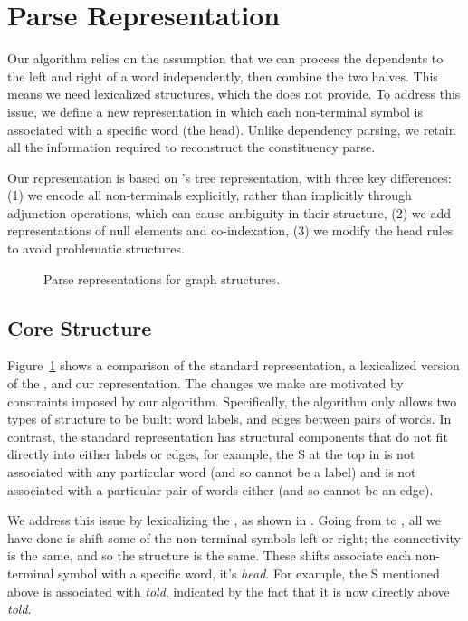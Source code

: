 \section{Parse Representation} \label{sec:representation}

Our algorithm relies on the assumption that we can process the dependents to the left and right of a word independently, then combine the two halves.
This means we need lexicalized structures, which the \ptb does not provide.
To address this issue, we define a new representation in which each non-terminal symbol is associated with a specific word (the head).
Unlike dependency parsing, we retain all the information required to reconstruct the constituency parse.

Our representation is based on \textcite{cck}'s tree representation, with three key differences:
(1) we encode all non-terminals explicitly, rather than implicitly through adjunction operations, which can cause ambiguity in their structure,
(2) we add representations of null elements and co-indexation,
(3) we modify the head rules to avoid problematic structures.

\begin{figure}
  
  \caption[Parse representations for graph structures.]{ \label{fig:repr2}
    Parse representations for graph structures.
  }
\end{figure}

\subsection{Core Structure} \label{sec:rep-core}

Figure~\ref{fig:repr2} shows a comparison of the standard \ptb representation, a lexicalized version of the \ptb, and our representation.
The changes we make are motivated by constraints imposed by our algorithm.
Specifically, the algorithm only allows two types of structure to be built: word labels, and edges between pairs of words.
In contrast, the standard \ptb representation has structural components that do not fit directly into either labels or edges, for example, the S at the top in  is not associated with any particular word (and so cannot be a label) and is not associated with a particular pair of words either (and so cannot be an edge).

We address this issue by lexicalizing the \ptb, as shown in .
Going from  to , all we have done is shift some of the non-terminal symbols left or right; the connectivity is the same, and so the structure is the same.
These shifts associate each non-terminal symbol with a specific word, it's \emph{head}.
For example, the S mentioned above is associated with \emph{told}, indicated by the fact that it is now directly above \emph{told}.

